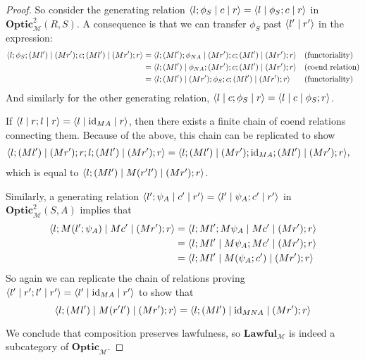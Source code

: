 \documentclass[11pt,letterpaper]{article}
\theoremstyle{plain}
\theoremstyle{definition}
\newcommand{\M}{\mathscr{M}}
\newcommand{\Optic}{\mathbf{Optic}}
\newcommand{\Twoptic}{\mathbf{Optic}^2}
\newcommand{\Lawful}{\mathbf{Lawful}}
\newcommand{\id}{\mathrm{id}}
\newcommand{\rep}[2]{{\ensuremath \left\langle #1 \mid #2 \right\rangle}}
\newcommand{\repthree}[3]{{\ensuremath \langle #1 \mid #2 \mid #3 \rangle}}
\begin{document}
\begin{proof}
  So consider the generating relation $\repthree{l;\phi_S}{c}{r} = \repthree{l}{\phi_S ; c}{r}$ in $\Twoptic_\M(R, S)$. A consequence is that we can transfer $\phi_S$ past $\rep{l'}{r'}$ in the expression:
  \begin{align*}
    \repthree{l;\phi_S;(Ml')}{(Mr'); c ;(Ml')}{(Mr') ; r}
    &= \repthree{l;(Ml');\phi_{NA}}{(Mr'); c ;(Ml')}{(Mr') ; r} && \text{(functoriality)} \\
    &= \repthree{l;(Ml')}{\phi_{NA};(Mr'); c ;(Ml')}{(Mr') ; r} && \text{(coend relation)} \\
    &= \repthree{l;(Ml')}{(Mr');\phi_{S}; c ;(Ml')}{(Mr') ; r} && \text{(functoriality)}
  \end{align*}
  And similarly for the other generating relation, $\repthree{l}{c;\phi_S}{r} = \repthree{l}{c}{\phi_S; r}$.

  If $\repthree{l}{r;l}{r} = \repthree{l}{\id_{MA}}{r}$, then there exists a finite chain of coend relations connecting them. Because of the above, this chain can be replicated to show
  \begin{align*}
    \repthree{l;(Ml')}{(Mr');r;l;(Ml')}{(Mr') ; r} &= \repthree{l;(Ml')}{(Mr');\id_{MA};(Ml')}{(Mr') ; r},
  \end{align*}
  which is equal to $\repthree{l;(Ml')}{M(r'l')}{(Mr') ; r}$.

  Similarly, a generating relation $\repthree{l';\psi_A}{c'}{r'} = \repthree{l'}{\psi_A ; c'}{r'}$ in $\Twoptic_\M(S, A)$ implies that
  \begin{align*}
    \repthree{l;M(l';\psi_A)}{Mc'}{(Mr') ; r}
    &= \repthree{l;Ml';M\psi_A}{Mc'}{(Mr') ; r} \\
    &= \repthree{l;Ml'}{M\psi_A ; Mc'}{(Mr') ; r} \\
    &= \repthree{l;Ml'}{M(\psi_A;c')}{(Mr') ; r}
  \end{align*}
  So again we can replicate the chain of relations proving $\repthree{l'}{r';l'}{r'} = \repthree{l'}{\id_{MA}}{r'}$ to show that
  \[\repthree{l;(Ml')}{M(r'l')}{(Mr') ; r} = \repthree{l;(Ml')}{\id_{MNA}}{(Mr') ; r} \]

  We conclude that composition preserves lawfulness, so $\Lawful_\M$ is indeed a subcategory of $\Optic_\M$.
\end{proof}
\end{document}
